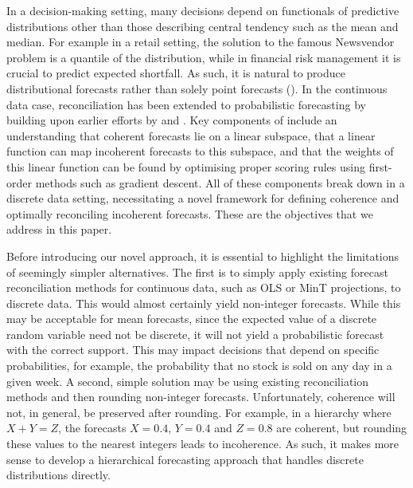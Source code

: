 \documentclass[a4paper,review,11pt,authoryear]{elsarticle}
\theoremstyle{definition}
\begin{document}
In a decision-making setting, many decisions depend on functionals of predictive distributions other than those describing central tendency such as the mean and median. For example in a retail setting, the solution to the famous Newsvendor problem is a quantile of the distribution, while in financial risk management it is crucial to predict expected shortfall. As such, it is natural to produce distributional forecasts rather than solely point forecasts (\citealp{gneitingProbabilisticForecasting2014}). In the continuous data case, reconciliation has been extended to probabilistic forecasting by \cite{panagiotelisProbabilisticForecastReconciliation2022} building upon earlier efforts by \cite{jeonProbabilisticForecastReconciliation2019} and \cite{bentaiebHierarchicalProbabilisticForecasting2020}. Key components of \cite{panagiotelisProbabilisticForecastReconciliation2022} include an understanding that coherent forecasts lie on a linear subspace, that a linear function can map incoherent forecasts to this subspace, and that the weights of this linear function can be found by optimising proper scoring rules using first-order methods such as gradient descent. All of these components break down in a discrete data setting, necessitating a novel framework for defining coherence and optimally reconciling incoherent forecasts. These are the objectives that we address in this paper.

Before introducing our novel approach, it is essential to highlight the limitations of seemingly simpler alternatives. The first is to simply apply existing forecast reconciliation methods for continuous data, such as OLS or MinT projections, to discrete data. This would almost certainly yield non-integer forecasts. While this may be acceptable for mean forecasts, since the expected value of a discrete random variable need not be discrete, it will not yield a probabilistic forecast with the correct support. This may impact decisions that depend on specific probabilities, for example, the probability that no stock is sold on any day in a given week.  A second, simple solution may be using existing reconciliation methods and then rounding non-integer forecasts. Unfortunately, coherence will not, in general, be preserved after rounding. For example, in a hierarchy where $X+Y=Z$, the forecasts $X=0.4$, $Y=0.4$ and $Z=0.8$ are coherent, but rounding these values to the nearest integers leads to incoherence. As such, it makes more sense to develop a hierarchical forecasting approach that handles discrete distributions directly.
\end{document}
